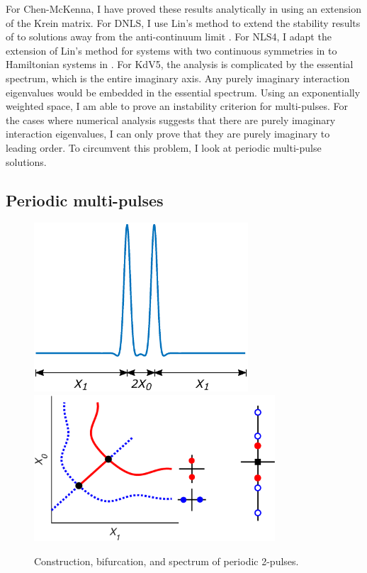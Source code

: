 \documentclass[12pt,reqno,oneside]{article}
\theoremstyle{definition}
\theoremstyle{remark}
\begin{document}
For Chen-McKenna, I have proved these results analytically in \cite{Kapitula2020} using an extension of the Krein matrix. For DNLS, I use Lin's method to extend the stability results of \cite{Kapitula2001,Kapitula2001a} to solutions away from the anti-continuum limit \cite{Parker2020}. For NLS4, I adapt the extension of Lin's method for systems with two continuous symmetries in \cite{Manukian} to Hamiltonian systems in \cite{Parker2020NLS4}. For KdV5, the analysis is complicated by the essential spectrum, which is the entire imaginary axis. Any purely imaginary interaction eigenvalues would be embedded in the essential spectrum. Using an exponentially weighted space, I am able to prove an instability criterion for multi-pulses. For the cases where numerical analysis suggests that there are purely imaginary interaction eigenvalues, I can only prove that they are purely imaginary to leading order. To circumvent this problem, I look at periodic multi-pulse solutions.

\subsection{Periodic multi-pulses}

\begin{figure}[H]
\begin{center}
\includegraphics[width=8cm]{images/DPperiodic.eps} \hspace{-1cm}
\includegraphics[width=9cm]{images/2pitchforkcoloreig2.eps}
\end{center}
\caption{Construction, bifurcation, and spectrum of periodic 2-pulses.}
\label{fig:periodic}
\end{figure}
\end{document}

